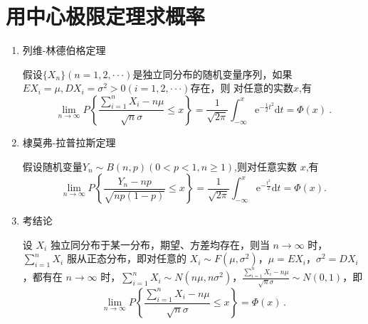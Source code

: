 \section{用中心极限定理求概率}
\begin{enumerate}
    \item 列维-林德伯格定理

          假设$\{X_n\}(n=1,2,\cdotp\cdotp\cdotp)$是独立同分布的随机变量序列，如果$EX_i=\mu,DX_i=\sigma^2>0(i=1,2,\cdotp\cdotp\cdotp)$存在，则
          对任意的实数$x$,有
          $$\lim_{n\to\infty}P\left\{\frac{\sum_{i=1}^{n}X_{i}-n\mu}{\sqrt{n}\sigma}\leqslant x\right\}=\frac{1}{\sqrt{2\pi}}\int_{-\infty}^{x}\mathrm{e}^{-\frac{1}{2}t^{2}}\mathrm{d}t=\Phi(x)\:.$$
    \item 棣莫弗-拉普拉斯定理

          假设随机变量$Y_n\sim B(n,p)(0<p<1,n\geqslant1)$,则对任意实数 $x$,有
          $$\lim_{n\to\infty}P\left\{\frac{Y_{n}-np}{\sqrt{np(1-p)}}\leqslant x\right\}=\frac{1}{\sqrt{2\pi}}\int_{-\infty}^{x}\mathrm{e}^{-\frac{t^{2}}{2}}\mathrm{d}t=\Phi(x).$$
    \item 考结论

          设 $X_i$ 独立同分布于某一分布，期望、方差均存在，则当 $n \to \infty$ 时，$\sum_{i=1}^{n} X_i$ 服从正态分布，即对任意的 $X_i \sim F(\mu, \sigma^2)$，$\mu = EX_i$，$\sigma^2 = DX_i$，都有在 $n \to \infty$ 时，$\sum_{i=1}^{n} X_i \sim N(n\mu, n\sigma^2)$，$\frac{\sum_{i=1}^{n} X_i - n\mu}{\sqrt{n}\sigma} \sim N(0, 1)$，即
          $$\lim_{n \to \infty} P\left\{ \frac{\sum_{i=1}^{n} X_i - n\mu}{\sqrt{n}\sigma} \leqslant x \right\} = \Phi(x) \, .$$
\end{enumerate}

